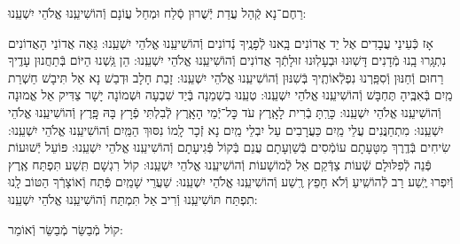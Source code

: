 \documentclass[twoside, openany, parskip=half, 11pt]{book}
\begin{document}
\begin{sometimes}
\begin{small}
\end{small}

\shatzvkahal
 רַחֶם־נָא קְֿהַל עֲדַת יְֿשֻׁרוּן סְֿלַח וּמְחַל עֲוֹנָם וְֿהוֹשִׁיעֵֽנוּ אֱלֹהֵי יִשְׁעֵֽנוּ:

\begin{small}
אָז כְּֿעֵינֵי עֲבָדִים אֶל יַד אֲדוֹנִים בָּֽאנוּ לְֿפָנֶֽיךָ נְֿדוֹנִים וְֿהוֹשִׁיעֵֽנוּ אֱלֹהֵי יִשְׁעֵֽנוּ:
גֵּאֶה אֲדוֹנֵי הָאֲדוֹנִים נִתְגָּֽרוּ בָֽנוּ מְֿדָנִים דָּשֽׁוּנוּ וּבְעָלֽוּנוּ זוּלָתְֿךָ אֲדוֹנִים וְֿהוֹשִׁיעֵֽנוּ אֱלֹהֵי יִשְׁעֵֽנוּ:
הֵן גַּֽשְׁנוּ הַיּוֹם בְּֿתַחֲנוּן עָדֶֽיךָ רַחוּם וְֿחַנּוּן וְֿסִפַּֽרְנוּ נִפְלְֿאוֹתֶֽיךָ בְּֿשִׁנּוּן וְֿהוֹשִׁיעֵֽנוּ אֱלֹהֵי יִשְׁעֵֽנוּ:
 זָבַת חָלָב וּדְבַשׁ נָא אַל תִּיבָשׁ חַשְׁרַת מַֽיִם בְּֿאִבֶּֽיהָ תֶּחְבָּשׁ וְֿהוֹשִׁיעֵֽנוּ אֱלֹהֵי יִשְׁעֵֽנוּ:
טְעֵֽנוּ בִשְׁמֵנָה בְּֿיַד שִׁבְעָה וּשְׁמוֹנָה יָשָׁר צַדִּיק אֵל אֱמוּנָה וְֿהוֹשִׁיעֵֽנוּ אֱלֹהֵי יִשְׁעֵֽנוּ:
כָּרַֽתָּ בְֿרִית לָאָֽרֶץ עֹד כׇּל־יְֿמֵי הָאָֽרֶץ לְֿבִלְתִּי פְֿרָץ בָּהּ פָּֽרֶץ וְֿהוֹשִׁיעֵֽנוּ אֱלֹהֵי יִשְׁעֵֽנוּ:
מִתְחַנֲּנִים עֲלֵי מַֽיִם כַּעֲרָבִים עַל יִבְלֵי מַֽיִם נָא זְֿכָר לָֽמוֹ נִסּוּךְ הַמַּֽיִם וְֿהוֹשִׁיעֵֽנוּ אֱלֹהֵי יִשְׁעֵֽנוּ:
שִׂיחִים בְּֿדֶֽרֶךְ מַטָּעָתָם עוֹמְֿסִים בְּֿשַׁוְעָתָם עֲנֵם בְּֿקוֹל פְּֿגִיעָתָם וְֿהוֹשִׁיעֵֽנוּ אֱלֹהֵי יִשְׁעֵֽנוּ:
פּוֹעֵל יְֿשׁוּעוֹת פְּֿנֵה לְֿפִלּוּלָם שְֿׁעוֹת צַדְּֿקֵם אֵל לְֿמוֹשָׁעוֹת וְֿהוֹשִׁיעֵֽנוּ אֱלֹהֵי יִשְׁעֵֽנוּ:
קוֹל רִגְשָׁם תִּֽשַׁע תִּפְתַּח אֶֽרֶץ וְֿיִפְרוּ יֶֽשַׁע רַב לְֿהוֹשִֽׁיעַ וְֿלֹא חָפֵץ רֶֽשַׁע וְֿהוֹשִׁיעֵֽנוּ אֱלֹהֵי יִשְׁעֵֽנוּ:
שַׁעֲרֵי שָׁמַֽיִם פְּֿתַח וְֿאוֹצָרְֿךָ הַטּוֹב לָֽנוּ תִפְתַּח תּוֹשִׁיעֵֽנוּ וְֿרִיב אַל תִּמְתַּח וְֿהוֹשִׁיעֵֽנוּ אֱלֹהֵי יִשְׁעֵֽנוּ:

\end{small}

\begin{large}
 קוֹל מְֿבַשֵּׂר מְֿבַשֵּׂר וְֿאוֹמֵר:

\end{large}


\end{sometimes}
\end{document}
